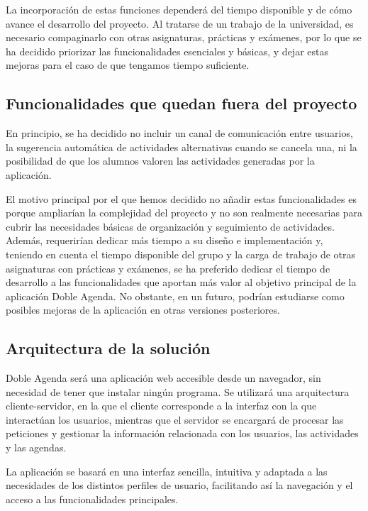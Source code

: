 La incorporación de estas funciones dependerá del tiempo disponible y de cómo avance el desarrollo del proyecto. Al tratarse de un trabajo de la universidad, es necesario compaginarlo con otras asignaturas, prácticas y exámenes, por lo que se ha decidido priorizar las funcionalidades esenciales y básicas, y dejar estas mejoras para el caso de que tengamos tiempo suficiente.

\subsection{Funcionalidades que quedan fuera del proyecto}
En principio, se ha decidido no incluir un canal de comunicación entre usuarios, la sugerencia automática de actividades alternativas cuando se cancela una, ni la posibilidad de que los alumnos valoren las actividades generadas por la aplicación.

El motivo principal por el que hemos decidido no añadir estas funcionalidades es porque ampliarían la complejidad del proyecto y no son realmente necesarias para cubrir las necesidades básicas de organización y seguimiento de actividades. Además, requerirían dedicar más tiempo a su diseño e implementación y, teniendo en cuenta el tiempo disponible del grupo y la carga de trabajo de otras asignaturas con prácticas y exámenes, se ha preferido dedicar el tiempo de desarrollo a las funcionalidades que aportan más valor al objetivo principal de la aplicación Doble Agenda. No obstante, en un futuro, podrían estudiarse como posibles mejoras de la aplicación en otras versiones posteriores.

\subsection{Arquitectura de la solución}
Doble Agenda será una aplicación web accesible desde un navegador, sin necesidad de tener que instalar ningún programa. Se utilizará una arquitectura cliente-servidor, en la que el cliente corresponde a la interfaz con la que interactúan los usuarios, mientras que el servidor se encargará de procesar las peticiones y gestionar la información relacionada con los usuarios, las actividades y las agendas.

La aplicación se basará en una interfaz sencilla, intuitiva y adaptada a las necesidades de los distintos perfiles de usuario, facilitando así la navegación y el acceso a las funcionalidades principales.